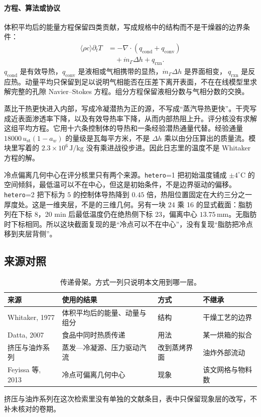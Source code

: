\paragraph{方程、算法或协议}
体积平均后的能量方程保留四类贡献，写成规格中的结构而不是干燥器的边界条件：
\begin{align*}
\langle\rho c\rangle\partial_t T
&=-\nabla\cdot(q_{\mathrm{cond}}+q_{\mathrm{conv}})\\
&\quad+\dot m_\Gamma\Delta h+q_{\mathrm{rxn}}.
\end{align*}
$q_{\mathrm{cond}}$ 是有效导热，$q_{\mathrm{conv}}$ 是液相或气相携带的显热，$\dot m_\Gamma\Delta h$ 是界面相变，$\ q_{\mathrm{rxn}}$ 是反应热。动量平均只保留到足以说明气相能否在压差下离开表面，不在在线模型里求解完整的孔隙 Navier–Stokes 方程。组分方程保留液相分数与气相分数的交换。

蒸比干热更快进入内部，写成冷凝潜热为正的源，不写成“蒸汽导热更快”。干壳写成近表面渗透率下降，以及有效导热率下降，从而内部热阻上升。评分核没有求解这组平均方程。它用十六条控制体的导热和一条经验潜热通量代替。经验通量 $18000\,u_{\mathrm{st}}(1-a_w)$ 的量级是瓦每平方米，不是 $\Delta h$ 乘以由分压算出的质量流。模块里写着的 $2.3\times 10^{6}\,\mathrm{J/kg}$ 没有乘进战役步进。因此日志里的温度不是 Whitaker 方程的解。

冷点偏离几何中心在评分核里只有两个来源。\texttt{hetero}=1 把初始温度铺成 $\pm 4^\circ\mathrm{C}$ 的空间倾斜，最低温可以不在中心，但这是初始条件，不是边界驱动的偏移。\texttt{hetero}=2 把下标为 $5$ 的控制体导热降到 $0.45$ 倍，热阻位置固定在大约三分之一厚度处。这是一维夹层，不是\cite{feyissa2013}的三维几何。另有一块 24 乘 16 的显式截面：脂肪列在下标 8，20 min 后最低温度仍在绝热侧下标 23，偏离中心 \(13.75\,\mathrm{mm}\)。无脂肪时下标相同。所以这块截面复现的是“冷点可以不在中心”，没有复现“脂肪把冷点移到夹层背侧”。

\subsection{来源对照}
\begin{table}[ht]
\centering
\caption{传递骨架。方式一列只说明本文用到哪一层。}
\begin{tabularx}{\textwidth}{lXll}
\toprule
来源 & 使用的结果 & 方式 & 不继承 \\
\midrule
Whitaker, 1977 & 体积平均后的能量、动量与组分 & 结构 & 干燥工艺的边界 \\
Datta, 2007 & 食品中同时热质传递 & 用法 & 某一烘箱的拟合 \\
挤压与油炸系列 & 蒸发—冷凝源、压力驱动汽流 & 改到蒸烤界面 & 油炸外部流动 \\
Feyissa 等, 2013 & 冷点可偏离几何中心 & 现象 & 该文网格与物料数 \\
\bottomrule
\end{tabularx}
\end{table}
挤压与油炸系列在这次检索里没有单独的文献条目，表中只保留现象层的改写，不补未核对的卷期。

